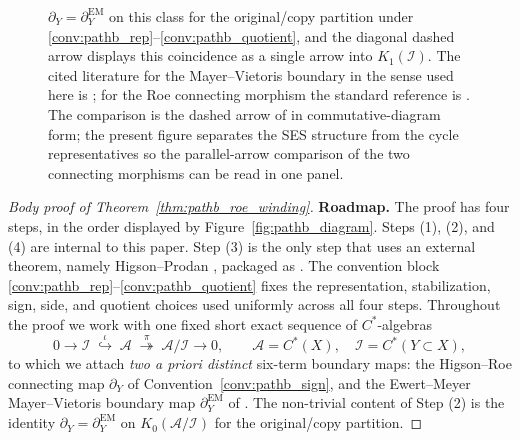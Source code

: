 \documentclass[11pt]{article}
\numberwithin{equation}{section}
\theoremstyle{definition}
\theoremstyle{remark}
\begin{document}
\begin{figure}[H]
{\(\partial_Y=\partial^{\mathrm{EM}}_Y\) on this class for the original/copy partition under
\ref{conv:pathb_rep}--\ref{conv:pathb_quotient}, and the diagonal dashed arrow displays
this coincidence as a single arrow into \(K_1(\mathcal I)\). The cited literature for the
Mayer--Vietoris boundary in the sense used here is \cite{EwertMeyer2019}; for the Roe
connecting morphism the standard reference is \cite{HigsonRoeI,HigsonRoeII,HigsonRoeIII}. The comparison is the
dashed arrow of  in commutative-diagram form; the present figure
separates the SES structure from the cycle representatives so the parallel-arrow
comparison of the two connecting morphisms can be read in one panel.}
\label{fig:roe_em_ses_comparison}
\end{figure}

\begin{proof}[Body proof of Theorem~\ref{thm:pathb_roe_winding}]
\textbf{Roadmap.} The proof has four steps, in the order displayed by
Figure~\ref{fig:pathb_diagram}. Steps (1), (2), and (4) are internal to this paper. Step (3) is
the only step that uses an external theorem, namely Higson--Prodan
\cite{HigsonProdanUniversalPRL,HigsonProdanUniversalArxiv}, packaged as .
The convention block \ref{conv:pathb_rep}--\ref{conv:pathb_quotient} fixes the representation,
stabilization, sign, side, and quotient choices used uniformly across all four steps. Throughout
the proof we work with one fixed short exact sequence of \(C^*\)-algebras
\begin{equation}\label{eq:body_short_exact}
0\longrightarrow \mathcal I\;\overset{\iota}{\hookrightarrow}\;\mathcal A
\;\overset{\pi}{\twoheadrightarrow}\;\mathcal A/\mathcal I\longrightarrow 0,
\qquad
\mathcal A=C^*(X),\quad \mathcal I=C^*(Y\subset X),
\end{equation}
to which we attach \emph{two a priori distinct} six-term boundary maps: the Higson--Roe
connecting map \(\partial_Y\) of Convention~\ref{conv:pathb_sign}, and the Ewert--Meyer
Mayer--Vietoris boundary map \(\partial^{\mathrm{EM}}_Y\) of \cite{EwertMeyer2019}. The
non-trivial content of Step (2) is the identity
\(\partial_Y=\partial^{\mathrm{EM}}_Y\) on \(K_0(\mathcal A/\mathcal I)\) for the original/copy
partition.


\end{proof}
\end{document}
